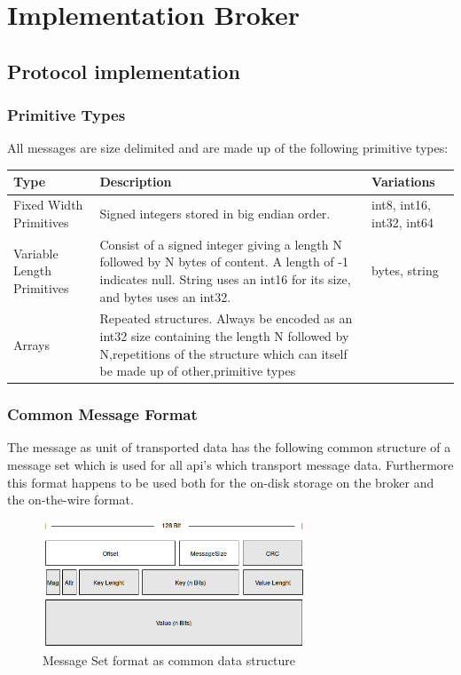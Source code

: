 \chapter{Implementation Broker}

\section{Protocol implementation}
\label{sec-protocol}
\subsection{Primitive Types}
All messages are size delimited and are made up of the following primitive
types: 

\begin{table}[h]
\begin{tabular}{| p{3cm}| p{7cm} | l |}
\hline
\textbf{Type} & \textbf{Description} & \textbf{Variations} \\ \hline
Fixed Width Primitives     & Signed integers stored in big endian order.                                                                                                                                     & int8, int16, int32, int64 \\ \hline
Variable Length Primitives & Consist of a signed integer giving a length N followed by N bytes of content. A length of -1 indicates null. String uses an int16 for its size, and bytes uses an int32.        & bytes, string             \\ \hline
Arrays                     & Repeated structures. Always be encoded as an int32 size containing the length N followed by N,repetitions of the structure which can itself be made up of other,primitive types &                           \\ \hline
\end{tabular}
\end{table}

\subsection{Common Message Format}
The message as unit of transported data has the following common structure of a
message set which is used for all api's which transport message data.
Furthermore this format happens to be used both for the on-disk storage on the
broker and the on-the-wire format.

\begin{figure}[H]
    \centering
    \includegraphics[width=0.7\textwidth]{images/protocol-messageSet.png}
    \caption{Message Set format as common data structure}
    \label{fig:protocol-request-header.png}
\end{figure}

